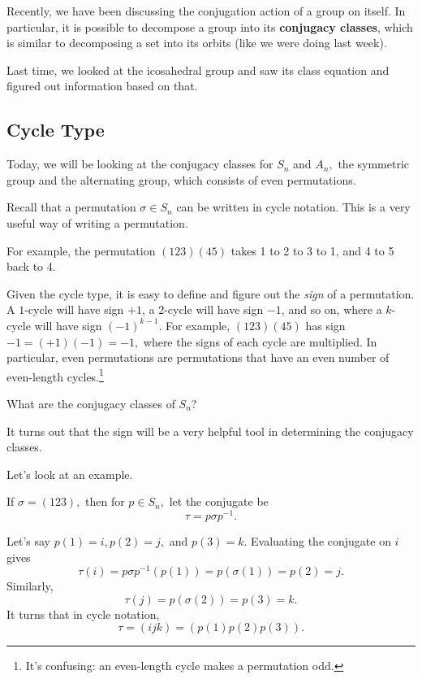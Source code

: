 Recently, we have been discussing the conjugation action of a group on itself. In particular, it is possible to decompose a group into its \textbf{conjugacy classes}, which is similar to decomposing a set into its orbits (like we were doing last week).

Last time, we looked at the icosahedral group and saw its class equation and figured out information based on that.

\subsection{Cycle Type}
Today, we will be looking at the conjugacy classes for $S_n$ and $A_n,$ the symmetric group and the alternating group, which consists of even permutations. 

Recall that a permutation $\sigma \in S_n$ can be written in cycle notation. This is a very useful way of writing a permutation.

\begin{example}
For example, the permutation $(123)(45)$ takes 1 to 2 to 3 to 1, and 4 to 5 back to 4. 
\end{example}

Given the cycle type, it is easy to define and figure out the \emph{sign} of a permutation. A $1$-cycle will have sign $+1$, a $2$-cycle will have sign $-1$, and so on, where a $k$-cycle will have sign $(-1)^{k-1}.$ For example, $(123)(45)$ has sign $-1 = (+1)(-1) = -1,$ where the signs of each cycle are multiplied. In particular, even permutations are permutations that have an even number of even-length cycles.\footnote{It's confusing: an even-length cycle makes a permutation odd.}

\begin{qq}
What are the conjugacy classes of $S_n$?
\end{qq}

It turns out that the sign will be a very helpful tool in determining the conjugacy classes. 



Let's look at an example.
\begin{example}
 If $\sigma = (123),$ then for $p \in S_n,$ let the conjugate be \[\tau = p\sigma p^{-1}.\] 
 
 Let's say $p(1) = i, p(2) = j,$ and $p(3) = k.$ Evaluating the conjugate on $i$ gives \[\tau(i) = p\sigma p^{-1}(p(1)) = p(\sigma(1)) = p(2) = j.\] Similarly, \[\tau(j) = p(\sigma(2)) = p(3) = k.\] It turns that in cycle notation, \[\tau = (ijk) = (p(1) p(2) p(3)).\] 
\end{example}

